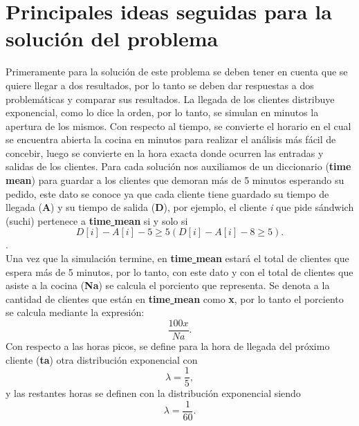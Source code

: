 \documentclass{book}
\begin{document}
	\section{Principales ideas seguidas para la soluci\'on del problema}
	Primeramente para la soluci\'on de este problema se deben tener en cuenta que se quiere llegar a dos resultados, por lo tanto se deben dar respuestas a dos problem\'aticas y comparar sus resultados. La llegada de los clientes distribuye exponencial, como lo dice la orden, por lo tanto, se simulan en minutos la apertura de los mismos. Con respecto al tiempo, se convierte el horario en el cual se encuentra abierta la cocina en minutos para realizar el an\'alisis m\'as f\'acil de concebir, luego se convierte en la hora exacta donde ocurren las entradas y salidas de los clientes. Para cada soluci\'on nos auxiliamos de un diccionario (\textbf{time\underline{ }mean}) para guardar a los clientes que demoran m\'as de 5 minutos esperando su pedido, este dato se conoce ya que cada cliente tiene guardado su tiempo de llegada (\textbf{A}) y su tiempo de salida (\textbf{D}), por ejemplo, el cliente \textit{i} que pide s\'andwich (suchi) pertenece a \textbf{time\underline{ }mean} si y solo si \begin{equation}
	D[i] - A[i] - 5 \geq 5  (D[i] - A[i] - 8 \geq 5).
\end{equation} . \\
	Una vez que la simulaci\'on termine, en \textbf{time\underline{ }mean} estar\'a el total de clientes que espera m\'as de 5 minutos, por lo tanto, con este dato y con el total de clientes que asiste a la cocina (\textbf{Na}) se calcula el porciento que representa. Se denota a la cantidad de clientes que est\'an en \textbf{time\underline{ }mean} como \textbf{x}, por lo tanto el porciento se calcula mediante la expresi\'on:
	\begin{equation}
		 \frac{100x}{Na} .
	\end{equation}
	Con respecto a las horas picos, se define para la hora de llegada del pr\'oximo cliente (\textbf{ta}) otra distribuci\'on exponencial con 
	\begin{equation}
		\lambda = \frac{1}{5},
	\end{equation}		
	 y las restantes horas se definen con la distribuci\'on exponencial siendo
	\begin{equation}
		\lambda = \frac{1}{60}.
	\end{equation}		 
	  
\end{document}
